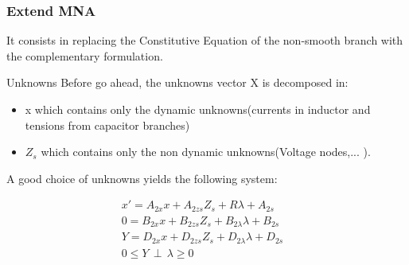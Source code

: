 
\frame
{
\frametitle{Extend MNA}
 It consists in replacing the Constitutive Equation of the non-smooth branch with the complementary
 formulation.

 \begin{block}{Unknowns}
 Before go ahead, the unknowns vector X is decomposed in:
\begin{itemize}
\item x which contains only the dynamic unknowns(currents in inductor and tensions from capacitor branches)
\item $Z_{s}$ which contains only the non dynamic unknowns(Voltage nodes,... ).
\end{itemize}
  \end{block}
  
 \begin{block}{A good choice of unknowns yields the following system:}
 
 \begin{eqnarray}
x'=A_{2x}x +A_{2zs}Z_{s} +R \lambda +A_{2s}&\label{eq2}\\
0=B_{2x}x+B_{2zs}Z_{s} + B_{2\lambda}\lambda + B_{2s}&\label{eq3}\\
Y=D_{2x}x+D_{2zs}Z_{s}+D_{2\lambda}\lambda + D_{2s} &\label{eq4}\\
0 \leq Y \, \perp \, \lambda \geq 0&\label{eqperp}
\end{eqnarray}

  \end{block}


}

